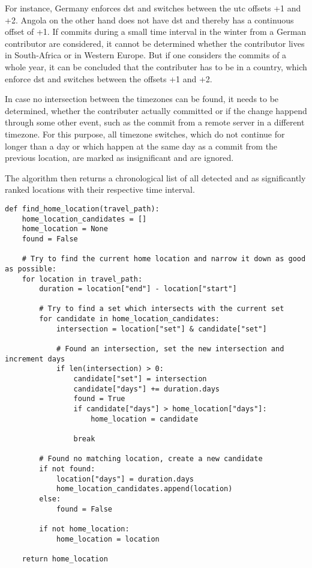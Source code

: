For instance, Germany enforces \ac{dst} and switches between the \ac{utc} offsets +1 and +2. Angola on the other hand does not have \ac{dst} and thereby has a continuous offset of +1.
If commits during a small time interval in the winter from a German contributor are considered, it cannot be determined whether the contributor lives in South-Africa or in Western Europe.
But if one considers the commits of a whole year, it can be concluded that the contributer has to be in a country, which enforce \ac{dst} and switches between the offsets +1 and +2.

In case no intersection between the timezones can be found, it needs to be determined, whether the contributer actually committed or if the change happend through some other event, such as the commit from a remote server in a different timezone.
For this purpose, all timezone switches, which do not continue for longer than a day or which happen at the same day as a commit from the previous location, are marked as insignificant and are ignored.

The algorithm then returns a chronological list of all detected and as significantly ranked locations with their respective time interval.


\begin{verbatim}
def find_home_location(travel_path):
    home_location_candidates = []
    home_location = None
    found = False

    # Try to find the current home location and narrow it down as good as possible:
    for location in travel_path:
        duration = location["end"] - location["start"]

        # Try to find a set which intersects with the current set
        for candidate in home_location_candidates:
            intersection = location["set"] & candidate["set"]

            # Found an intersection, set the new intersection and increment days
            if len(intersection) > 0:
                candidate["set"] = intersection
                candidate["days"] += duration.days
                found = True
                if candidate["days"] > home_location["days"]:
                    home_location = candidate

                break

        # Found no matching location, create a new candidate
        if not found:
            location["days"] = duration.days
            home_location_candidates.append(location)
        else:
            found = False

        if not home_location:
            home_location = location

    return home_location
\end{verbatim}
\begingroup
{}\label{lst:home-location-analysis}
\endgroup

